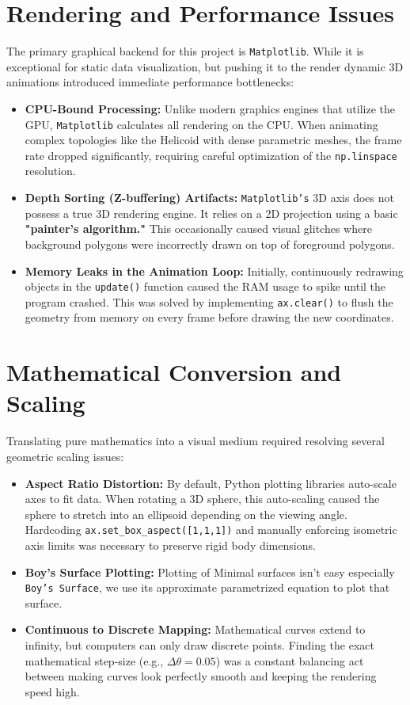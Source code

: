 \documentclass[12pt, a4paper]{report}
\begin{document}
\section{Rendering and Performance Issues}
The primary graphical backend for this project is \texttt{Matplotlib}. While it is exceptional for static data visualization, but pushing it to the render dynamic 3D animations introduced immediate performance bottlenecks:

\begin{itemize}
    \item \textbf{CPU-Bound Processing:} Unlike modern graphics engines that utilize the GPU, \texttt{Matplotlib} calculates all rendering on the CPU. When animating complex topologies like the Helicoid with dense parametric meshes, the frame rate dropped significantly, requiring careful optimization of the \texttt{np.linspace} resolution.\cite{matplotlib_docs}
    \item \textbf{Depth Sorting (Z-buffering) Artifacts:} \texttt{Matplotlib's} 3D axis does not possess a true 3D rendering engine. It relies on a 2D projection using a basic \textbf{"painter's algorithm."} \cite{matplotlib_docs} This occasionally caused visual glitches where background polygons were incorrectly drawn on top of foreground polygons.
    \item \textbf{Memory Leaks in the Animation Loop:} Initially, continuously redrawing objects in the \texttt{update()} function caused the RAM usage to spike until the program crashed. This was solved by implementing \texttt{ax.clear()} to flush the geometry from memory on every frame before drawing the new coordinates.
\end{itemize}

\section{Mathematical Conversion and Scaling}
Translating pure mathematics into a visual medium required resolving several geometric scaling issues:

\begin{itemize}
    \item \textbf{Aspect Ratio Distortion:} By default, Python plotting libraries auto-scale axes to fit data. When rotating a 3D sphere, this auto-scaling caused the sphere to stretch into an ellipsoid depending on the viewing angle. Hardcoding \texttt{ax.set\_box\_aspect([1,1,1])} and manually enforcing isometric axis limits was necessary to preserve rigid body dimensions.
    \item \textbf{Boy's Surface Plotting:} Plotting of Minimal surfaces isn't easy especially \texttt{Boy's Surface}, we use its approximate parametrized equation to plot that surface.
    \cite{boys_surface_wiki}
    \item \textbf{Continuous to Discrete Mapping:} Mathematical curves extend to infinity, but computers can only draw discrete points. Finding the exact mathematical step-size (e.g., $\Delta\theta = 0.05$) was a constant balancing act between making curves look perfectly smooth and keeping the rendering speed high.
\end{itemize}
\end{document}

